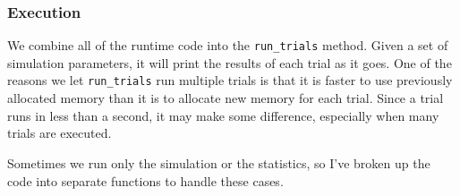 \documentclass{article}
\begin{document}
      \subsubsection{Execution}

	We combine all of the runtime code into the \verb|run_trials| method.
	Given a set of simulation parameters, it will print the results of each
	trial as it goes. One of the reasons we let \verb|run_trials| run
	multiple trials is that it is faster to use previously allocated memory
	than it is to allocate new memory for each trial. Since a trial runs in
	less than a second, it may make some difference, especially when many
	trials are executed.

	Sometimes we run only the simulation or the statistics, so I've broken
	up the code into separate functions to handle these cases.
\end{document}
